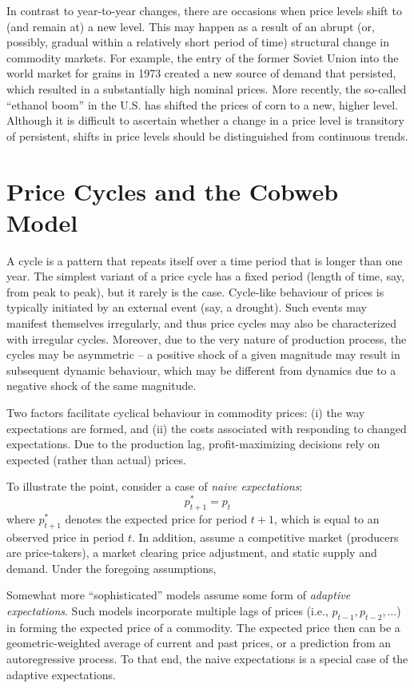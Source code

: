 \documentclass[
]{book}
\begin{document}
In contrast to year-to-year changes, there are occasions when price levels shift to (and remain at) a new level. This may happen as a result of an abrupt (or, possibly, gradual within a relatively short period of time) structural change in commodity markets. For example, the entry of the former Soviet Union into the world market for grains in 1973 created a new source of demand that persisted, which resulted in a substantially high nominal prices. More recently, the so-called ``ethanol boom'' in the U.S. has shifted the prices of corn to a new, higher level. Although it is difficult to ascertain whether a change in a price level is transitory of persistent, shifts in price levels should be distinguished from continuous trends.

\hypertarget{price-cycles-and-the-cobweb-model}{%
\section{Price Cycles and the Cobweb Model}\label{price-cycles-and-the-cobweb-model}}

A cycle is a pattern that repeats itself over a time period that is longer than one year. The simplest variant of a price cycle has a fixed period (length of time, say, from peak to peak), but it rarely is the case. Cycle-like behaviour of prices is typically initiated by an external event (say, a drought). Such events may manifest themselves irregularly, and thus price cycles may also be characterized with irregular cycles. Moreover, due to the very nature of production process, the cycles may be asymmetric -- a positive shock of a given magnitude may result in subsequent dynamic behaviour, which may be different from dynamics due to a negative shock of the same magnitude.

Two factors facilitate cyclical behaviour in commodity prices: (i) the way expectations are formed, and (ii) the costs associated with responding to changed expectations. Due to the production lag, profit-maximizing decisions rely on expected (rather than actual) prices.

To illustrate the point, consider a case of \emph{naive expectations}: \[p_{t+1}^{*} = p_{t}\] where \(p_{t+1}^{*}\) denotes the expected price for period \(t+1\), which is equal to an observed price in period \(t\). In addition, assume a competitive market (producers are price-takers), a market clearing price adjustment, and static supply and demand. Under the foregoing assumptions,

Somewhat more ``sophisticated'' models assume some form of \emph{adaptive expectations}. Such models incorporate multiple lags of prices (i.e., \(p_{t-1},p_{t-2},\dots\)) in forming the expected price of a commodity. The expected price then can be a geometric-weighted average of current and past prices, or a prediction from an autoregressive process. To that end, the naive expectations is a special case of the adaptive expectations.
\end{document}
